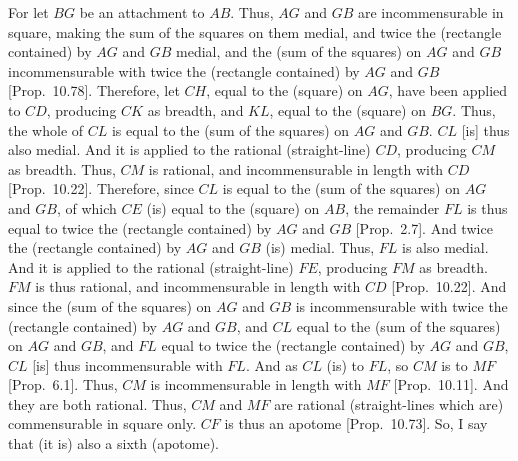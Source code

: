 \begin{Parallel}{}{}
{For let $BG$ be an attachment to $AB$. Thus, $AG$ and $GB$
are incommensurable in square, making the sum of the squares on them
medial, and twice the (rectangle contained) by $AG$ and $GB$ medial,
and the (sum of the squares) on $AG$ and $GB$ incommensurable
with twice the (rectangle contained) by $AG$ and $GB$ [Prop.~10.78]. Therefore, let $CH$, equal to
the (square) on $AG$, have been applied to $CD$, producing $CK$
as breadth, and $KL$, equal to the (square) on $BG$. Thus, the whole of
$CL$ is equal to the (sum of the squares) on $AG$ and $GB$. $CL$ [is]
thus also medial. And it is applied to the rational (straight-line) $CD$,
producing $CM$ as breadth. Thus,  $CM$ is rational, and incommensurable
in length with $CD$ [Prop.~10.22]. Therefore,
since $CL$ is equal to the (sum of the squares) on $AG$ and $GB$,
of which $CE$ (is) equal to the (square) on $AB$, the remainder $FL$
is thus equal to twice the (rectangle contained) by $AG$ and $GB$ [Prop.~2.7]. And twice the (rectangle contained)
by  $AG$ and $GB$ (is) medial. Thus, $FL$ is also medial.
And it is applied to the rational (straight-line) $FE$, producing $FM$
as breadth. $FM$ is thus rational, and incommensurable
in length with $CD$ [Prop.~10.22]. 
And since the (sum of the squares) on $AG$ and $GB$ is incommensurable
with twice the (rectangle contained) by $AG$ and $GB$, and $CL$ equal to the
(sum of the squares) on $AG$ and $GB$, and $FL$ equal to twice the
(rectangle contained) by $AG$ and $GB$, $CL$ [is] thus
incommensurable with $FL$. And as $CL$ (is) to $FL$, so $CM$ is
to $MF$ [Prop.~6.1]. Thus, $CM$ is incommensurable
in length with $MF$ [Prop.~10.11]. And they
are both rational. Thus, $CM$ and $MF$ are rational (straight-lines which are) commensurable in square only. $CF$ is thus an apotome [Prop.~10.73]. So, I say that (it is) also a
sixth (apotome).

}
\end{Parallel}
